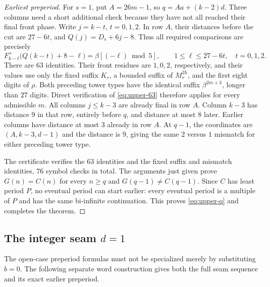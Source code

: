 \documentclass[11pt]{article}
\theoremstyle{remark}\newtheorem{remark}[theorem]{Remark}
\begin{document}
\begin{proof}[Earliest preperiod]
For $s=1$, put $A=26m-1$, so $q=Aa+(k-2)d$.  Three columns need a
short additional check because they have not all reached their final
front phase.  Write $j=k-t$, $t=0,1,2$.  In row $A$, their distances
before the cut are $27-6t$, and
$Q(j)=D_s+6j-8$.  Thus all required comparisons are precisely
\begin{equation}\label{eq:upper-63}
 F^+_{k-t}\bigl(Q(k-t)+8-\ell\bigr)
       =\beta[(-\ell)\bmod5],
 \qquad 1\le\ell\le27-6t,\quad t=0,1,2.
\end{equation}
There are $63$ identities.  Their front residues are $1,0,2$,
respectively, and their values use only the fixed suffix $K_r$,
a bounded suffix of $M_r^{2h}$, and the first eight digits of $\rho$.
Both preceding tower types have the identical suffix
$\beta^{2m+3}$, longer than $27$ digits.  Direct verification of
\eqref{eq:upper-63} therefore applies for every admissible $m$.
All columns $j\le k-3$ are already final in row $A$.  Column $k-3$
has distance $9$ in that row, entirely before $q$, and distance at
most $8$ later.  Earlier columns have distance at most $3$ already
in row $A$.  At $q-1$, the coordinates are $(A,k-3,d-1)$ and the
distance is $9$, giving the same $2$ versus $1$ mismatch for either
preceding tower type.

The certificate  verifies the $63$
identities and the fixed suffix and mismatch identities, $76$ symbol
checks in total.  The arguments just given prove $G(n)=C(n)$ for
every $n\ge q$ and $G(q-1)\ne C(q-1)$.  Since $C$ has least period
$P$, no eventual period can start earlier: every eventual period is
a multiple of $P$ and has the same bi-infinite continuation.  This
proves \eqref{eq:upper-q} and completes the theorem.
\end{proof}

\subsection{The integer seam \texorpdfstring{$d=1$}{d=1}}

The open-case preperiod formulas must not be specialized merely by
substituting $b=0$.  The following separate word construction gives
both the full seam sequence and its exact earlier preperiod.
\end{document}
